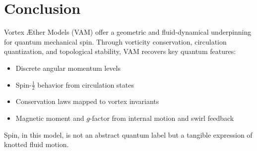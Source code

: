 \section*{Conclusion}

Vortex \AE{}ther Models (VAM) offer a geometric and fluid-dynamical underpinning for quantum mechanical spin. Through vorticity conservation, circulation quantization, and topological stability, VAM recovers key quantum features:

\begin{itemize}

\item Discrete angular momentum levels

\item Spin-$\tfrac{1}{2}$ behavior from circulation states

\item Conservation laws mapped to vortex invariants

\item Magnetic moment and $g$-factor from internal motion and swirl feedback

\end{itemize}

Spin, in this model, is not an abstract quantum label but a tangible expression of knotted fluid motion.


